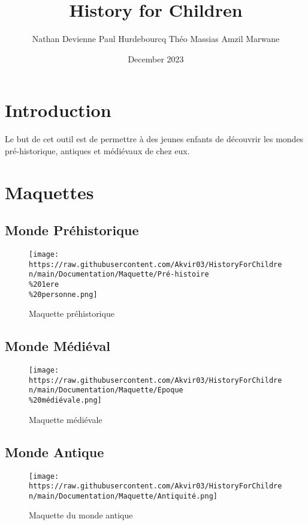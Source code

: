 \documentclass[
]{article}
\title{History for Children}
\author{Nathan Devienne \textbar{} Paul Hurdebourcq \textbar{} Théo
Massias \textbar{} Amzil Marwane}
\date{December 2023}
\begin{document}
\maketitle

\section{Introduction}\label{introduction}

Le but de cet outil est de permettre à des jeunes enfants de découvrir
les mondes pré-historique, antiques et médiévaux de chez eux.

\section{Maquettes}\label{maquettes}

\subsection{Monde Préhistorique}\label{monde-pruxe9historique}

\begin{figure}
\centering
\texttt{[image: https://raw.githubusercontent.com/Akvir03/HistoryForChildren/main/Documentation/Maquette/Pré-histoire\\\%201ere\\\%20personne.png]}
\caption{Maquette préhistorique}
\end{figure}

\subsection{Monde Médiéval}\label{monde-muxe9diuxe9val}

\begin{figure}
\centering
\texttt{[image: https://raw.githubusercontent.com/Akvir03/HistoryForChildren/main/Documentation/Maquette/Epoque\\\%20médiévale.png]}
\caption{Maquette médiévale}
\end{figure}

\subsection{Monde Antique}\label{monde-antique}

\begin{figure}
\centering
\texttt{[image: https://raw.githubusercontent.com/Akvir03/HistoryForChildren/main/Documentation/Maquette/Antiquité.png]}
\caption{Maquette du monde antique}
\end{figure}
\end{document}
